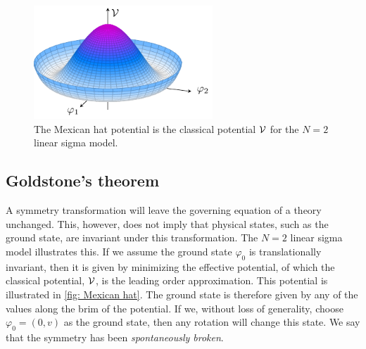 \begin{figure}[ht]
    \centering
    \hspace*{1cm}
    \includegraphics[width=0.6\textwidth]{figurer/mexican_hat.pdf}
    \caption{The Mexican hat potential is the classical potential $\mathcal V$ for the $N=2 $ linear sigma model.}
    \label{fig: Mexican hat}
\end{figure}









\subsection{Goldstone's theorem}

A symmetry transformation will leave the governing equation of a theory unchanged.
This, however, does not imply that physical states, such as the ground state, are invariant under this transformation.
The $N = 2$ linear sigma model illustrates this.
If we assume the ground state $\varphi_{0}$ is translationally invariant, then it is given by minimizing the effective potential, of which the classical potential, $\mathcal V$, is the leading order approximation.
This potential is illustrated in \autoref{fig: Mexican hat}.
The ground state is therefore given by any of the values along the brim of the potential.
If we, without loss of generality, choose $\varphi_0 = (0, v)$ as the ground state, then any rotation will change this state.
We say that the symmetry has been \emph{spontaneously broken}.

